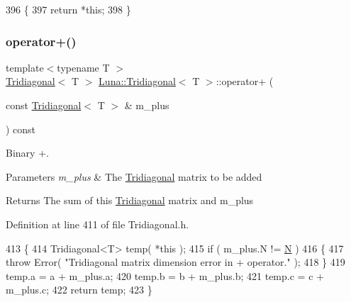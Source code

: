 \begin{DoxyCode}
396   \{
397     \textcolor{keywordflow}{return} *\textcolor{keyword}{this};
398   \}
\end{DoxyCode}
\mbox{\label{classLuna_1_1Tridiagonal_a8e28947c6514a84755620ee96400c9cb}} 
\subsubsection{\texorpdfstring{operator+()}{operator+()}\hspace{0.1cm}{\footnotesize\ttfamily [2/2]}}
{\footnotesize\ttfamily template$<$typename T $>$ \\
\hyperlink{classLuna_1_1Tridiagonal}{Tridiagonal}$<$ T $>$ \hyperlink{classLuna_1_1Tridiagonal}{Luna\+::\+Tridiagonal}$<$ T $>$\+::operator+ (\begin{DoxyParamCaption}\item[{const \hyperlink{classLuna_1_1Tridiagonal}{Tridiagonal}$<$ T $>$ \&}]{m\+\_\+plus }\end{DoxyParamCaption}) const\hspace{0.3cm}{\ttfamily [inline]}}



Binary +. 


\begin{DoxyParams}{Parameters}
{\em m\+\_\+plus} & The \hyperlink{classLuna_1_1Tridiagonal}{Tridiagonal} matrix to be added \\
\hline
\end{DoxyParams}
\begin{DoxyReturn}{Returns}
The sum of this \hyperlink{classLuna_1_1Tridiagonal}{Tridiagonal} matrix and m\+\_\+plus 
\end{DoxyReturn}


Definition at line 411 of file Tridiagonal.\+h.


\begin{DoxyCode}
413   \{
414     Tridiagonal<T> temp( *\textcolor{keyword}{this} );
415     \textcolor{keywordflow}{if} ( m\_plus.N != \hyperlink{namespaceHeat__plot_a7d050092798e28458a263710837bda77}{N}  )
416     \{
417       \textcolor{keywordflow}{throw} Error( \textcolor{stringliteral}{"Tridiagonal matrix dimension error in + operator."} );
418     \}
419     temp.a = a + m\_plus.a;
420     temp.b = b + m\_plus.b;
421     temp.c = c + m\_plus.c;
422     \textcolor{keywordflow}{return} temp;
423   \}
\end{DoxyCode}
\mbox{\label{classLuna_1_1Tridiagonal_a5f34fd29d4ba9f517897a4c9eafa8157}} 
